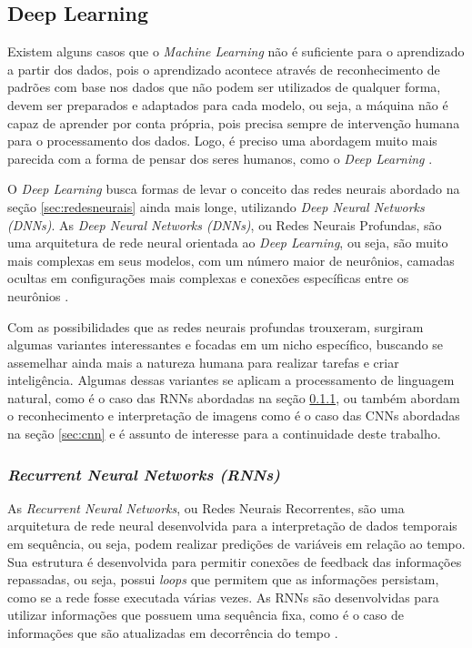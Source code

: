 \subsection{Deep Learning}
Existem alguns casos que o \emph{Machine Learning} não é suficiente para o aprendizado a partir dos dados, pois o aprendizado acontece através de reconhecimento de padrões com base nos dados que não podem ser utilizados de qualquer forma, devem ser preparados e adaptados para cada modelo, ou seja, a máquina não é capaz de aprender por conta própria, pois precisa sempre de intervenção humana para o processamento dos dados. Logo, é preciso uma abordagem muito mais parecida com a forma de pensar dos seres humanos, como o \emph{Deep Learning} \cite{deepLearningPython, deepLearningTensorFlow}.

O \emph{Deep Learning} busca formas de levar o conceito das redes neurais abordado na seção \ref{sec:redesneurais} ainda mais longe, utilizando \emph{Deep Neural Networks (DNNs)}. As \emph{Deep Neural Networks (DNNs)}, ou Redes Neurais Profundas, são uma arquitetura de rede neural orientada ao \emph{Deep Learning}, ou seja, são muito mais complexas em seus modelos, com um número maior de neurônios, camadas ocultas em configurações mais complexas e conexões específicas entre os neurônios \cite{deepLearningTensorFlow}.

Com as possibilidades que as redes neurais profundas trouxeram, surgiram algumas variantes interessantes e focadas em um nicho específico, buscando se assemelhar ainda mais a natureza humana para realizar tarefas e criar inteligência. Algumas dessas variantes se aplicam a processamento de linguagem natural, como é o caso das RNNs abordadas na seção \ref{sec:rnn}, ou também abordam o reconhecimento e interpretação de imagens como é o caso das CNNs abordadas na seção \ref{sec:cnn} e é assunto de interesse para a continuidade deste trabalho.

\subsubsection{\emph{Recurrent Neural Networks (RNNs)}}
\label{sec:rnn}
As \emph{Recurrent Neural Networks}, ou Redes Neurais Recorrentes, são uma arquitetura de rede neural desenvolvida para a interpretação de dados temporais em sequência, ou seja, podem realizar predições de variáveis em relação ao tempo. Sua estrutura é desenvolvida para permitir conexões de feedback das informações repassadas, ou seja, possui \emph{loops} que permitem que as informações persistam, como se a rede fosse executada várias vezes. As RNNs são desenvolvidas para utilizar informações que possuem uma sequência fixa, como é o caso de informações que são atualizadas em decorrência do tempo \cite{deepLearningTensorFlow}.

